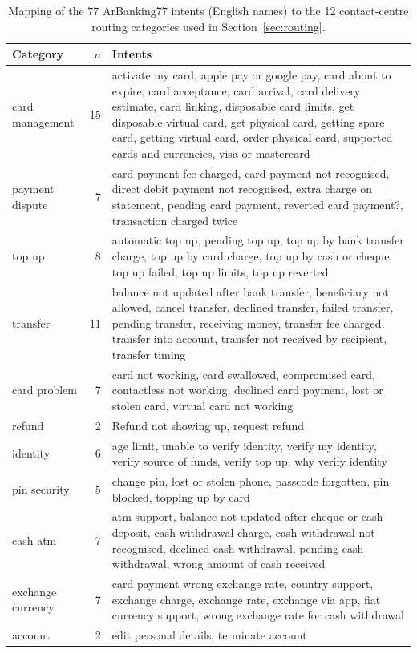 \begin{table}[t]\centering\footnotesize\caption{Mapping of the 77 ArBanking77 intents (English names) to the 12 contact-centre routing categories used in Section~\ref{sec:routing}.}\label{tab:mapping}
\begin{tabular}{lrp{}}\toprule
Category & $n$ & Intents \\\midrule
card management & 15 & activate my card, apple pay or google pay, card about to expire, card acceptance, card arrival, card delivery estimate, card linking, disposable card limits, get disposable virtual card, get physical card, getting spare card, getting virtual card, order physical card, supported cards and currencies, visa or mastercard \\
payment dispute & 7 & card payment fee charged, card payment not recognised, direct debit payment not recognised, extra charge on statement, pending card payment, reverted card payment?, transaction charged twice \\
top up & 8 & automatic top up, pending top up, top up by bank transfer charge, top up by card charge, top up by cash or cheque, top up failed, top up limits, top up reverted \\
transfer & 11 & balance not updated after bank transfer, beneficiary not allowed, cancel transfer, declined transfer, failed transfer, pending transfer, receiving money, transfer fee charged, transfer into account, transfer not received by recipient, transfer timing \\
card problem & 7 & card not working, card swallowed, compromised card, contactless not working, declined card payment, lost or stolen card, virtual card not working \\
refund & 2 & Refund not showing up, request refund \\
identity & 6 & age limit, unable to verify identity, verify my identity, verify source of funds, verify top up, why verify identity \\
pin security & 5 & change pin, lost or stolen phone, passcode forgotten, pin blocked, topping up by card \\
cash atm & 7 & atm support, balance not updated after cheque or cash deposit, cash withdrawal charge, cash withdrawal not recognised, declined cash withdrawal, pending cash withdrawal, wrong amount of cash received \\
exchange currency & 7 & card payment wrong exchange rate, country support, exchange charge, exchange rate, exchange via app, fiat currency support, wrong exchange rate for cash withdrawal \\
account & 2 & edit personal details, terminate account \\
\bottomrule\end{tabular}\end{table}

